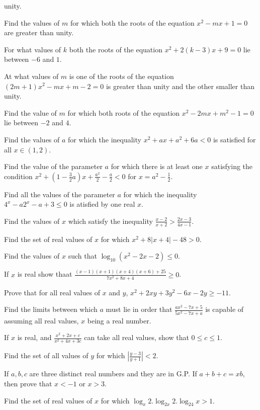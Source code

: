   unity.
\item Find the values of $m$ for which both the roots of the equation $x^2 - mx + 1 = 0$ are greater than
  unity.
\item For what values of $k$ both the roots of the equation $x^2 + 2(k - 3)x + 9 = 0$ lie between $-6$ and
  $1$.
\item At what values of $m$ is one of the roots of the equation $(2m + 1)x^2 - mx + m - 2 = 0$ is greater
  than unity and the other smaller than unity.
\item Find the value of $m$ for which both roots of the equation $x^2 - 2mx + m^2 - 1 = 0$ lie between $-2$
  and $4$.
\item Find the values of $a$ for which the inequality $x^2 + ax + a^2 + 6a < 0$ is satisfied for all
  $x\in(1, 2)$.
\item Find the value of the parameter $a$ for which there is at least one $x$ satisfying the condition $x^2
  + \left(1 - \frac{3}{2}a\right)x + \frac{a^2}{2} - \frac{a}{2} < 0$ for $x = a^2 - \frac{1}{2}$.
\item Find all the values of the parameter $a$ for which the inequality $4^x - a2^x - a + 3\leq 0$ is
  atisfied by one real $x$.
\item Find the values of $x$ which satisfy the inequality $\frac{x - 2}{x + 2} > \frac{2x - 3}{4x - 1}$.
\item Find the set of real values of $x$ for which $x^2 + 8|x + 4| - 48 > 0$.
\item Find the values of $x$ such that $\log_{10}(x^2 - 2x - 2)\leq 0$.
\item If $x$ is real show thaat $\frac{(x - 1)(x + 1)(x + 4)(x + 6) + 25}{7x^2 + 8x + 4}\geq 0$.
\item Prove that for all real values of $x$ and $y$, $x^2 + 2xy + 3y^2 - 6x - 2y\geq -11$.
\item Find the limits between which $a$ must lie in order that $\frac{ax^2 - 7x + 5}{5x^2 - 7x + a}$ is
  capable of assuming all real values, $x$ being a real number.
\item If $x$ is real, and $\frac{x^2 + 2x + c}{x^2 + 4x + 3c}$ can take all real values, show that $0\leq
  c\leq 1$.
\item Find the set of all values of $y$ for which $\left|\frac{y - 3}{y + 1}\right| < 2$.
\item If $a, b, c$ are three distinct real numbers and they are in G.P. If $a + b + c = xb$, then prove that
  $x < -1$ or $x > 3$.
\item Find the set of real values of $x$ for which $\log_x2.\log_{2x}2.\log_24x > 1$.
\stopitemize
